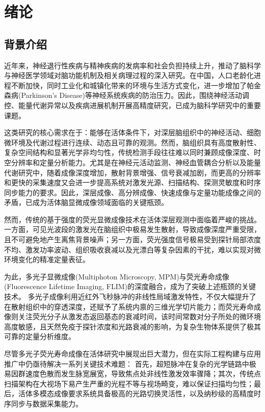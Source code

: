 \chapter{绪论}\label{chap:1}

\section{背景介绍}\label{1.1}
近年来，神经退行性疾病与精神疾病的发病率和社会负担持续上升，推动了脑科学与神经医学领域对脑功能机制及相关病理过程的深入研究\cite{RN2016}。在中国，人口老龄化进程不断加快，同时工业化和城镇化带来的环境与生活方式变化，进一步增加了帕金森病(Parkinson's Disease)等神经系统疾病的防治压力\cite{RN2015}。因此，围绕神经活动调控、能量代谢异常以及疾病进展机制开展高精度研究，已成为脑科学研究中的重要课题。

这类研究的核心需求在于：能够在活体条件下，对深层脑组织中的神经活动、细胞微环境及代谢过程进行连续、动态且可靠的观测。然而，脑组织具有高度散射性、复杂空间结构和显著光学非均匀性，传统检测手段往往难以同时兼顾成像深度、时空分辨率和定量分析能力。尤其是在神经元活动监测、神经血管耦合分析以及能量代谢研究中，随着成像深度增加，散射背景增强、信号衰减加剧，而更高的分辨率和更快的采集速度又会进一步提高系统对激发光源、扫描结构、探测灵敏度和时序同步能力的要求。因此，深层成像、高分辨成像、快速成像与定量功能成像之间的矛盾，已成为活体脑显微成像领域面临的关键瓶颈。

然而，传统的基于强度的荧光显微成像技术在活体深层观测中面临着严峻的挑战。 一方面，可见光波段的激发光在脑组织中极易发生散射，导致成像深度严重受限，且不可避免地产生离焦背景噪声；另一方面，荧光强度信号极易受到探针局部浓度不均、激发功率波动、组织吸收衰减以及光漂白等复杂因素的干扰，难以实现对微环境变化的精准定量表征。

为此，多光子显微成像(Multiphoton Microscopy, MPM)与荧光寿命成像(Fluorescence Lifetime Imaging, FLIM)的深度融合，成为了突破上述瓶颈的关键技术。 多光子成像利用近红外飞秒脉冲的非线性局域激发特性，不仅大幅提升了在散射组织中的穿透深度，还赋予了系统内禀的三维光学切片能力；而荧光寿命成像则关注荧光分子从激发态返回基态的衰减时间，该时间常数对分子所处的微环境高度敏感，且天然免疫于探针浓度和光路衰减的影响，为复杂生物体系提供了极其可靠的定量分析维度。

尽管多光子荧光寿命成像在活体研究中展现出巨大潜力，但在实际工程构建与应用推广中仍亟待解决一系列关键技术难题： 首先，超短脉冲在复杂的光学链路中极易因群速度色散而发生脉宽展宽，导致焦点处非线性激发效率骤降；其次，传统点扫描架构在大视场下易产生严重的光程不等与视场畸变，难以保证扫描均匀性；最后，活体多模态成像要求系统具备极高的光路切换灵活性，以及纳秒级的高精度时序同步与数据采集能力。

